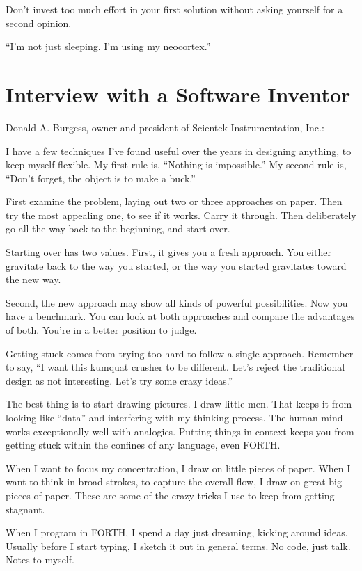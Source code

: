 Don't invest too much effort in your first solution without asking
yourself for a second opinion.


``I'm not just sleeping. I'm using my neocortex.''

\section{Interview with a Software Inventor}

Donald A. Burgess, owner and president of Scientek Instrumentation,
Inc.:

I have a few techniques I've found useful over the years in designing
anything, to keep myself flexible. My first rule is, ``Nothing is impossible.''
My second rule is, ``Don't forget, the object is to make a buck.''

First examine the problem, laying out two or three approaches on paper.
Then try the most appealing one, to see if it works. Carry it through. Then
deliberately go all the way back to the beginning, and start over.

Starting over has two values. First, it gives you a fresh approach. You
either gravitate back to the way you started, or the way you started
gravitates toward the new way.

Second, the new approach may show all kinds of powerful possibilities. Now
you have a benchmark. You can look at both approaches and compare the
advantages of both. You're in a better position to judge.

Getting stuck comes from trying too hard to follow a single approach.
Remember to say, ``I want this kumquat crusher to be different. Let's
reject the traditional design as not interesting. Let's try some crazy
ideas.''

The best thing is to start drawing pictures. I draw little men. That keeps
it from looking like ``data'' and interfering with my thinking process. The
human mind works exceptionally well with analogies. Putting things in
context keeps you from getting stuck within the confines of any language,
even FORTH.

When I want to focus my concentration, I draw on little pieces of paper.
When I want to think in broad strokes, to capture the overall flow, I draw
on great big pieces of paper. These are some of the crazy tricks I use to keep
from getting stagnant.

When I program in FORTH, I spend a day just dreaming, kicking around
ideas. Usually before I start typing, I sketch it out in general terms. No
code, just talk. Notes to myself.

